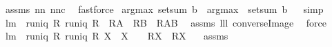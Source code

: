 \begin{isabellebody}
%
\isadelimproof
%
\endisadelimproof
%
\isatagproof
{}\isamarkupfalse%
\ assms\ nn{}{}\ nn{}{}c\ \isamarkupfalse%
\ fastforce%
\endisatagproof
{\isafoldproof}%
%
\isadelimproof
\isanewline
%
\endisadelimproof
{}\isamarkupfalse%
\ {\isachardoublequoteopen}argmax\ {\isacharparenleft}setsum{\isacharprime}\ b{\isacharparenright}\ {\isacharequal}\ {\isacharparenleft}argmax\ {\isasymcirc}\ setsum{\isacharprime}{\isacharparenright}\ b{\isachardoublequoteclose}%
\isadelimproof
\ %
\endisadelimproof
%
\isatagproof
{}\isamarkupfalse%
\ simp%
\endisatagproof
{\isafoldproof}%
%
\isadelimproof
%
\endisadelimproof
\isanewline
\isanewline
{}\isamarkupfalse%
\ lm{}{}{}{\isacharcolon}\ \ {\isachardoublequoteopen}runiq\ R{\isachardoublequoteclose}\ {\isachardoublequoteopen}runiq\ {\isacharparenleft}R{\isacharcircum}{\isacharminus}{}{\isacharparenright}{\isachardoublequoteclose}\ \ {\isachardoublequoteopen}R{\isacharbackquote}{\isacharbackquote}A\ {\isasyminter}\ {\isacharparenleft}R{\isacharbackquote}{\isacharbackquote}B{\isacharparenright}\ {\isacharequal}\ R{\isacharbackquote}{\isacharbackquote}{\isacharparenleft}A{\isasyminter}B{\isacharparenright}{\isachardoublequoteclose}\ \isanewline
%
\isadelimproof
%
\endisadelimproof
%
\isatagproof
{}\isamarkupfalse%
\ assms\ lll{}{}\ converse{\isacharunderscore}Image\ \isamarkupfalse%
\ force%
\endisatagproof
{\isafoldproof}%
%
\isadelimproof
\isanewline
%
\endisadelimproof
\isanewline
{}\isamarkupfalse%
\ lm{}{}{\isacharcolon}\ \ {\isachardoublequoteopen}runiq\ {\isacharparenleft}R{\isacharcircum}{\isacharminus}{}{\isacharparenright}{\isachardoublequoteclose}\ {\isachardoublequoteopen}runiq\ R{\isachardoublequoteclose}\ {\isachardoublequoteopen}X{}\ {\isasyminter}\ X{}\ {\isacharequal}\ {\isacharbraceleft}{\isacharbraceright}{\isachardoublequoteclose}\ \ {\isachardoublequoteopen}R{\isacharbackquote}{\isacharbackquote}X{}\ {\isasyminter}\ {\isacharparenleft}R{\isacharbackquote}{\isacharbackquote}X{}{\isacharparenright}\ {\isacharequal}\ {\isacharbraceleft}{\isacharbraceright}{\isachardoublequoteclose}\isanewline
%
\isadelimproof
%
\endisadelimproof
%
\isatagproof
{}\isamarkupfalse%
\ assms\ \isamarkupfalse%

\end{isabellebody}
